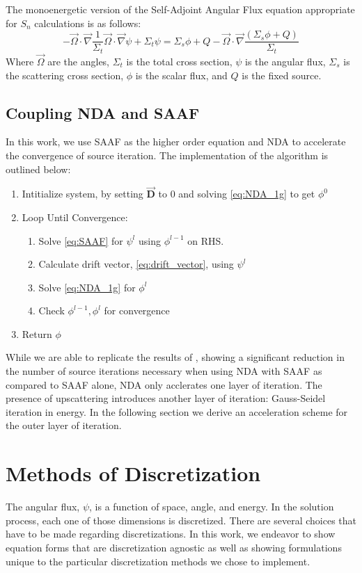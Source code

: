 The monoenergetic version of the Self-Adjoint Angular Flux equation appropriate for $S_n$ calculations is as follows:
\begin{equation}
    - \vec{\Omega} \cdot \vec{\nabla}\frac{1}{\Sigma_t}\vec{\Omega} \cdot \vec{\nabla} \psi + \Sigma_t \psi = \Sigma_s\phi + Q - \vec{\Omega} \cdot \vec{\nabla} \frac{(\Sigma_s\phi + Q)}{\Sigma_t}
    \label{eq:SAAF}
\end{equation}
Where $\vec{\Omega}$ are the angles, $\Sigma_t$ is the total cross section, $\psi$ is the angular flux, $\Sigma_s$ is the scattering cross section, $\phi$ is the scalar flux, and $Q$ is the fixed source.

\subsection{Coupling NDA and SAAF}
In this work, we use SAAF as the higher order equation and NDA to accelerate the convergence of source iteration. The implementation of the algorithm is outlined below:

\begin{enumerate}
    \item Intitialize system, by setting $\vec{\textbf{D}}$ to 0 and solving \eqref{eq:NDA_1g} to get $\phi^0$ 
    \item Loop Until Convergence:
        \begin{enumerate}
            \item Solve \eqref{eq:SAAF} for $\psi^l$ using $\phi^{l-1}$ on RHS.
            \item Calculate drift vector, \eqref{eq:drift_vector}, using $\psi^l$
            \item Solve \eqref{eq:NDA_1g} for $\phi^l$
            \item Check $\phi^{l-1}, \phi^l$ for convergence
        \end{enumerate}
    \item Return $\phi$
\end{enumerate}

While we are able to replicate the results of \cite{Wang2013}, showing a significant reduction in the number of source iterations necessary when using NDA with SAAF as compared to SAAF alone, NDA only acclerates one layer of iteration. The presence of upscattering introduces another layer of iteration: Gauss-Seidel iteration in energy. In the following section we derive an acceleration scheme for the outer layer of iteration.


\section{Methods of Discretization}
The angular flux, $\psi$, is a function of space, angle, and energy. In the solution process, each one of those dimensions is discretized. There are several choices that have to be made regarding discretizations. In this work, we endeavor to show equation forms that are discretization agnostic as well as showing formulations unique to the particular discretization methods we chose to implement. 

